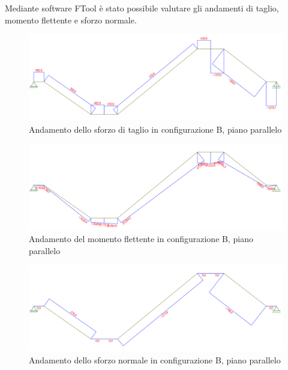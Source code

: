 Mediante software FTool è stato possibile valutare gli andamenti di taglio, momento flettente e sforzo normale. 
\begin{figure}[h]
    \centering
    \includegraphics[scale=0.5]{Immagini/AndamentoTaglioBAlberoPar.png}
    \caption{Andamento dello sforzo di taglio in configurazione B, piano parallelo}
    \label{fig:AndamentoTalioBAlberoPar}
\end{figure}
\begin{figure}[h]
    \centering
    \includegraphics[scale=0.5]{Immagini/AndamentoMomentoBAlberoPar.png}
    \caption{Andamento del momento flettente in configurazione B, piano parallelo}
    \label{fig:AndamentoMomentoBAlberoPar}
\end{figure}
\begin{figure}[h]
    \centering
    \includegraphics[scale=0.5]{Immagini/AndamentoNormaleBAlberoPar.png}
    \caption{Andamento dello sforzo normale in configurazione B, piano parallelo}
    \label{fig:AndamentoNormaleBAlberoPar}
\end{figure}
\newpage
